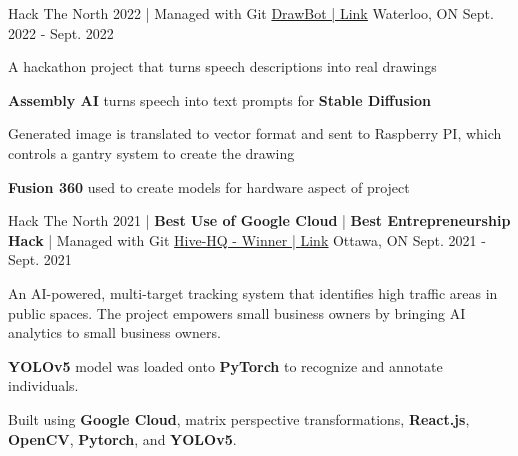 

\begin{cventries}

  \cventry
    {Hack The North 2022 | Managed with Git} %
    {\underline{DrawBot | \href{https://devpost.com/software/drawbot-ulof5z}{Link}}} %
    {Waterloo, ON} %
    {Sept. 2022 - Sept. 2022} %
    {
      \begin{cvitems} %
        \item {A hackathon project that turns speech descriptions into real drawings}
        \item {\textbf{Assembly AI} turns speech into text prompts for \textbf{Stable Diffusion}}
        \item {Generated image is translated to vector format and sent to Raspberry PI, which controls a gantry system to create the drawing}
        \item {\textbf{Fusion 360} used to create models for hardware aspect of project}
      \end{cvitems}
    }


  \cventry
    {Hack The North 2021 | \textbf{Best Use of Google Cloud} | \textbf{Best Entrepreneurship Hack} | Managed with Git} %
    {\underline{Hive-HQ - Winner | \href{https://devpost.com/software/hive-hq}{Link}}} %
    {Ottawa, ON} %
    {Sept. 2021 - Sept. 2021} %
    {
      \begin{cvitems} %
        \item {An AI-powered, multi-target tracking system that identifies high traffic areas in public spaces. The project empowers small business owners by bringing AI analytics to small business owners.}
        \item {\textbf{YOLOv5} model was loaded onto \textbf{PyTorch} to recognize and annotate individuals.}
        \item {Built using \textbf{Google Cloud}, matrix perspective transformations, \textbf{React.js}, \textbf{OpenCV}, \textbf{Pytorch}, and \textbf{YOLOv5}.}
      \end{cvitems}
    }


\end{cventries}
